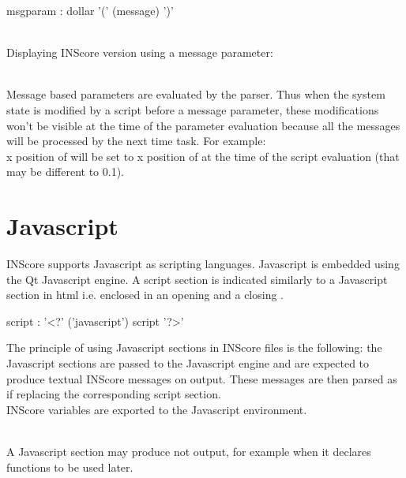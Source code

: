 \documentclass[a4paper,twoside]{report}
\newcommand{\sublevel}[1]	{\section{#1}}
\begin{document}
\begin{rail} 
msgparam : dollar '(' (message) ')'
\end{rail}

\example \\
Displaying INScore version using a message parameter:

\note{}\\
Message based parameters are evaluated by the parser. Thus when the system state is modified by a script before a message parameter, these modifications won't be visible at the time of the parameter evaluation because all the messages will be processed by the next time task. For example:\\
x position of  will be set to x position of  at the time of the script evaluation (that may be different to 0.1).


\sublevel{Javascript}
\label{javascript}

INScore supports Javascript as scripting languages. Javascript is embedded using the Qt Javascript engine. A script section is indicated similarly to a Javascript section in html i.e. enclosed in an opening  and a closing .

\begin{rail} 
script : '<?' ('javascript') script '?>'
\end{rail}

The principle of using Javascript sections in INScore files is the following: the Javascript sections are passed to the Javascript engine and are expected to produce textual INScore messages on output. These messages are then parsed as if replacing the corresponding script section.\\
INScore variables are exported to the Javascript environment.

\note{}\\
A Javascript section may produce not output, for example when it declares functions to be used later.


\example
{}
\end{document}

